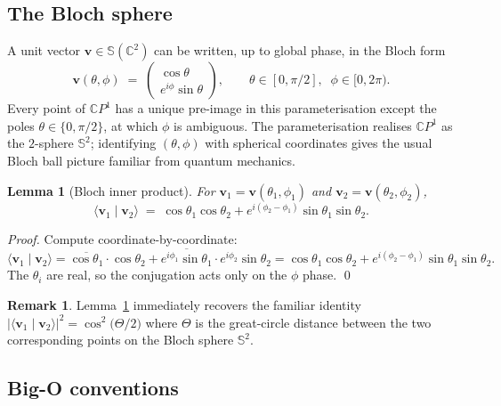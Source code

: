 \documentclass[11pt,letterpaper]{article}
\newtheorem{lemma}[theorem]{Lemma}
\theoremstyle{definition}
\newtheorem{remark}[theorem]{Remark}
\newcommand{\C}{\mathbb{C}}
\newcommand{\Sphere}{\mathbb{S}}
\newcommand{\inner}[2]{\langle #1 \mid #2 \rangle}
\newcommand{\abs}[1]{\lvert #1 \rvert}
\begin{document}
\subsection{The Bloch sphere}

A unit vector $\bm{v} \in \Sphere(\C^{2})$ can be written, up to global phase,
in the Bloch form
\[
\bm{v}(\theta, \phi) \;=\; \begin{pmatrix} \cos\theta \\
                                            e^{i\phi}\sin\theta \end{pmatrix},
\qquad \theta \in [0, \pi/2], \;\; \phi \in [0, 2\pi).
\]
Every point of $\C P^{1}$ has a unique pre-image in this parameterisation
except the poles $\theta \in \{0, \pi/2\}$, at which $\phi$ is ambiguous. The
parameterisation realises $\C P^{1}$ as the $2$-sphere $\Sphere^{2}$; identifying
$(\theta, \phi)$ with spherical coordinates gives the usual Bloch ball picture
familiar from quantum mechanics.

\begin{lemma}[Bloch inner product]
\label{lem:bloch-ip}
For $\bm{v}_{1} = \bm{v}(\theta_{1}, \phi_{1})$ and $\bm{v}_{2} = \bm{v}(
\theta_{2}, \phi_{2})$,
\[
\inner{\bm{v}_{1}}{\bm{v}_{2}}
   \;=\; \cos\theta_{1}\cos\theta_{2}
       + e^{i(\phi_{2} - \phi_{1})}\sin\theta_{1}\sin\theta_{2}.
\]
\end{lemma}
\begin{proof}
Compute coordinate-by-coordinate:
\[
\inner{\bm{v}_{1}}{\bm{v}_{2}}
   = \overline{\cos\theta_{1}} \cdot \cos\theta_{2}
   + \overline{e^{i\phi_{1}}\sin\theta_{1}} \cdot e^{i\phi_{2}}\sin\theta_{2}
   = \cos\theta_{1}\cos\theta_{2}
   + e^{i(\phi_{2} - \phi_{1})} \sin\theta_{1}\sin\theta_{2}.
\]
The $\theta_{i}$ are real, so the conjugation acts only on the $\phi$ phase.
\qed
\end{proof}

\begin{remark}
Lemma~\ref{lem:bloch-ip} immediately recovers the familiar identity
$\abs{\inner{\bm{v}_{1}}{\bm{v}_{2}}}^{2} = \cos^{2}\!\big(\Theta/2\big)$ where
$\Theta$ is the great-circle distance between the two corresponding points on
the Bloch sphere $\Sphere^{2}$.
\end{remark}

\subsection{Big-O conventions}
\end{document}
